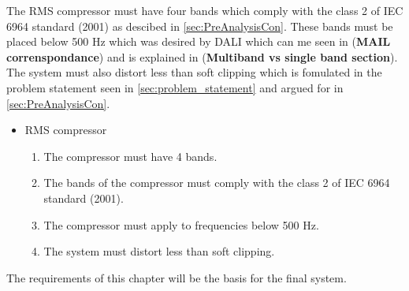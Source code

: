 The RMS compressor must have four bands which comply with the class 2 of IEC 6964 standard (2001) as descibed in \autoref{sec:PreAnalysisCon}. These bands must be placed below 500 Hz which was desired by DALI which can me seen in (\textbf{MAIL correnspondance}) and is explained in (\textbf{Multiband vs single band section}). The system must also distort less than soft clipping which is fomulated in the problem statement seen in \autoref{sec:problem_statement} and argued for in \autoref{sec:PreAnalysisCon}.

\begin{itemize}
\item RMS compressor
\begin{enumerate}
\item [\textlabel{8}{bands}] The compressor must have 4 bands.\\
\item [\textlabel{9}{standardband}] The bands of the compressor must comply with the class 2 of IEC 6964 standard (2001).\\
\item [\textlabel{10}{500below}] The compressor must apply to frequencies below 500 Hz.\\
\item [\textlabel{11}{softclipping}] The system must distort less than soft clipping.
\end{enumerate}
\end{itemize}

The requirements of this chapter will be the basis for the final system.



